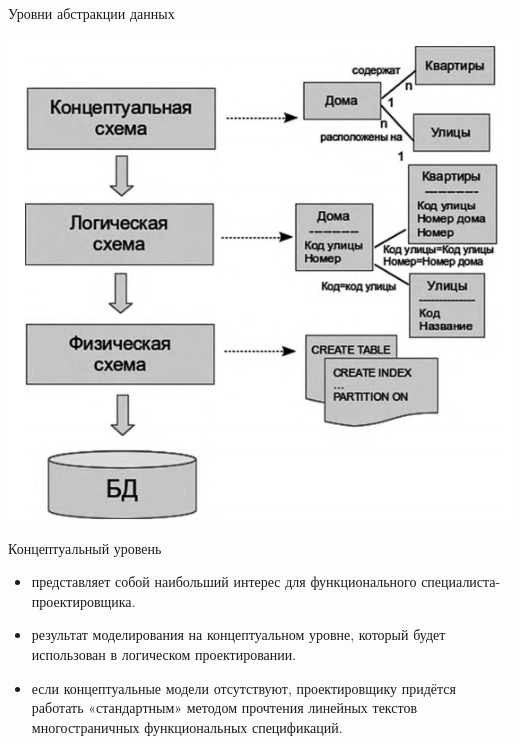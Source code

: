 \documentclass{beamer}
\begin{document}
\begin{frame}
\begin{block}{Уровни абстракции данных}
\begin{center}
\includegraphics[scale=0.5]{images/levels-01.png}
\end{center}
\end{block}
\end{frame}

\begin{frame}
\begin{block}{Концептуальный уровень}
\begin{itemize}
\item представляет собой наибольший интерес для функционального специалиста-проектировщика.
\item результат моделирования на концептуальном уровне, который будет использован в логическом проектировании.
\item если концептуальные модели отсутствуют, проектировщику придётся работать «стандартным» методом прочтения линейных текстов многостраничных функциональных спецификаций.
\end{itemize}
\end{block}
\end{frame} 
\end{document}
